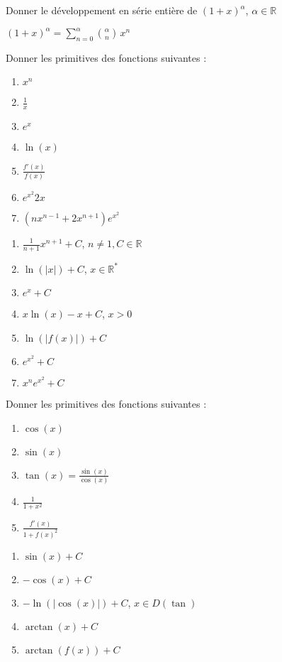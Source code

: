 \documentclass[12pt]{article}
\newcommand*{\xfield}[1]{\begin{mdframed}\centering #1\end{mdframed}\bigskip}
\newenvironment{note}{}{}
\begin{document}
\begin{note}
	\xfield{Donner le développement en série entière de $(1+x)^\alpha$, $\alpha \in \mathbb{R}$}
	\xfield{$(1+x)^\alpha = \sum\limits_{n=0}^{\alpha}{{\alpha \choose n}\, x^n}$}
\end{note}

\begin{note}
	\xfield{Donner les primitives des fonctions suivantes :
	\begin{enumerate}
		\item $x^n$
		\item $\frac{1}{x}$
		\item $e^x$
		\item $\ln(x)$
		\item $\frac{f'(x)}{f(x)}$
		\item $e^{x^2}2x$
		\item $(nx^{n-1}+2x^{n+1})e^{x^2}$
	\end{enumerate} }
	\xfield{\begin{enumerate}
		\item $\frac{1}{n+1}x^{n+1} + C$, $n\neq 1, C\in \mathbb{R}$
		\item $\ln(\vert x\vert ) + C$, $x \in \mathbb{R}^*$
		\item $e^x + C$
		\item $x\ln(x)-x+C$, $x>0$
		\item $\ln(\vert f(x) \vert ) +C$
		\item $e^{x^2}+C$
		\item $x^n e^{x^2}+C$
	\end{enumerate} }
\end{note}

\begin{note}
	\xfield{Donner les primitives des fonctions suivantes :
	\begin{enumerate}
		\item $\cos(x)$
		\item $\sin(x)$
		\item $\tan(x) = \frac{\sin(x)}{\cos(x)}$
		\item $\frac{1}{1+x^2}$
		\item $\frac{f'(x)}{1+f(x)^2}$
	\end{enumerate} }
	\xfield{\begin{enumerate}
		\item $\sin(x) +C$
		\item $-\cos(x) +C$
		\item $-\ln(\vert \cos(x) \vert ) + C$, $x \in D(\tan)$
		\item $\arctan(x) + C$
		\item $\arctan(f(x)) +C$
	\end{enumerate} }
\end{note}
\end{document}
